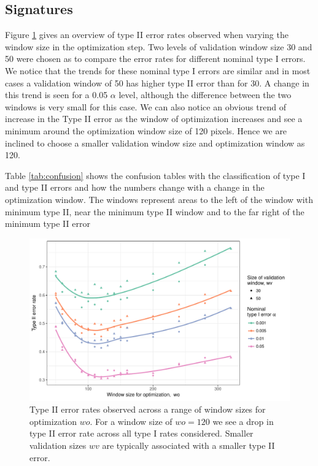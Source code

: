 \documentclass[12pt]{article}
\begin{document}
\subsection{Signatures}\label{signatures-1}

Figure \ref{fig:type2} gives an overview of type II error rates observed
when varying the window size in the optimization step. Two levels of
validation window size 30 and 50 were chosen as to compare the error
rates for different nominal type I errors. We notice that the trends for
these nominal type I errors are similar and in most cases a validation
window of 50 has higher type II error than for 30. A change in this
trend is seen for a 0.05 \(\alpha\) level, although the difference
between the two windows is very small for this case. We can also notice
an obvious trend of increase in the Type II error as the window of
optimization increases and see a minimum around the optimization window
size of 120 pixels. Hence we are inclined to choose a smaller validation
window size and optimization window as 120.

Table \ref{tab:confusion} shows the confusion tables with the
classification of type I and type II errors and how the numbers change
with a change in the optimization window. The windows represent areas to
the left of the window with minimum type II, near the minimum type II
window and to the far right of the minimum type II error

\begin{figure}

{\centering \includegraphics[width=\textwidth]{figures/type2-1} 

}

\caption{Type II error rates observed across a range of window sizes for optimization $wo$. For a window size of $wo = 120$ we see a drop in type II error rate across all type I rates considered. Smaller validation sizes $wv$ are typically associated with a smaller type II error.}\label{fig:type2}
\end{figure}
\end{document}
